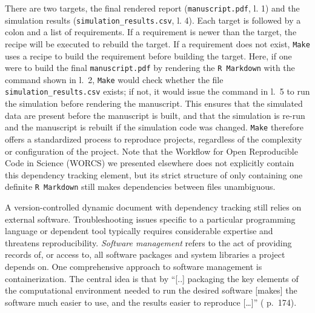 \documentclass[psych,tutorial,accept,moreauthors,pdftex]{Definitions/mdpi}
\newenvironment{Shaded}{\begin{snugshade}}{\end{snugshade}}
\newcommand{\AttributeTok}[1]{\textcolor[rgb]{0.77,0.63,0.00}{#1}}
\newcommand{\ExtensionTok}[1]{#1}
\newcommand{\NormalTok}[1]{#1}
\newcommand{\StringTok}[1]{\textcolor[rgb]{0.31,0.60,0.02}{#1}}
\begin{document}
%
%
%

There are two targets, the final rendered report
(\texttt{manuscript.pdf}, l. 1) and the simulation results
(\texttt{simulation\_results.csv}, l. 4). Each target is followed by a
colon and a list of requirements. If a requirement is newer than the
target, the recipe will be executed to rebuild the target. If a
requirement does not exist, \texttt{Make} uses a recipe to build the
requirement before building the target. Here, if one were to build the
final \texttt{manuscript.pdf} by rendering the \texttt{R\ Markdown} with
the command shown in l.~2, \texttt{Make} would check whether the file
\texttt{simulation\_results.csv} exists; if not, it would issue the
command in l.~5 to run the simulation before rendering the manuscript.
This ensures that the simulated data are present before the manuscript
is built, and that the simulation is re-run and the manuscript is
rebuilt if the simulation code was changed. \texttt{Make} therefore
offers a standardized process to reproduce projects, regardless of the
complexity or configuration of the project. Note that the Workflow for
Open Reproducible Code in Science (WORCS) we presented elsewhere
\citep{vanlissa2020worcs} does not explicitly contain this dependency
tracking element, but its strict structure of only containing one
definite \texttt{R\ Markdown} still makes dependencies between files
unambiguous.

A version-controlled dynamic document with dependency tracking still
relies on external software. Troubleshooting issues specific to a
particular programming language or dependent tool typically requires
considerable expertise and threatens reproducibility. \emph{Software
management} refers to the act of providing records of, or access to, all
software packages and system libraries a project depends on. One
comprehensive approach to software management is containerization. The
central idea is that by ``{[}..{]} packaging the key elements of the
computational environment needed to run the desired software {[}makes{]}
the software much easier to use, and the results easier to reproduce
{[}\ldots{]}'' (\citep{silverSoftwareSimplified2017} p.~174).
\end{document}
